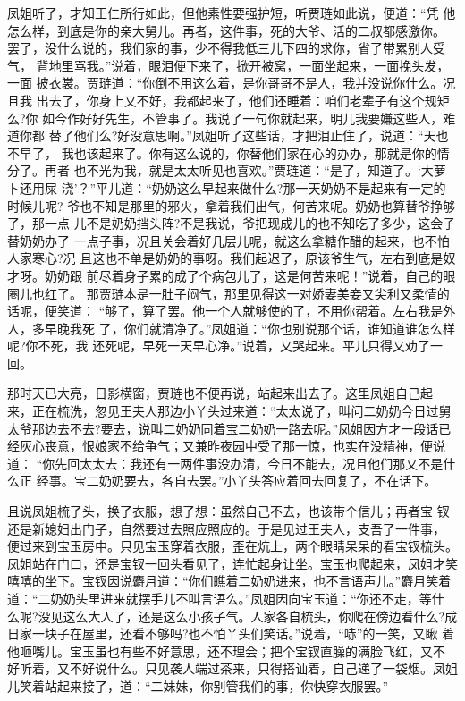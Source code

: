 凤姐听了，才知王仁所行如此，但他素性要强护短，听贾琏如此说，便道：“凭
他怎么样，到底是你的亲大舅儿。再者，这件事，死的大爷、活的二叔都感激你。
罢了，没什么说的，我们家的事，少不得我低三儿下四的求你，省了带累别人受气，
背地里骂我。”说着，眼泪便下来了，掀开被窝，一面坐起来，一面挽头发，一面
披衣裳。贾琏道：“你倒不用这么着，是你哥哥不是人，我并没说你什么。况且我
出去了，你身上又不好，我都起来了，他们还睡着：咱们老辈子有这个规矩么?你
如今作好好先生，不管事了。我说了一句你就起来，明儿我要嫌这些人，难道你都
替了他们么?好没意思啊。”凤姐听了这些话，才把泪止住了，说道：“天也不早了，
我也该起来了。你有这么说的，你替他们家在心的办办，那就是你的情分了。再者
也不光为我，就是太太听见也喜欢。”贾琏道：“是了，知道了。‘大萝卜还用屎
浇’？”平儿道：“奶奶这么早起来做什么?那一天奶奶不是起来有一定的时候儿呢?
爷也不知是那里的邪火，拿着我们出气，何苦来呢。奶奶也算替爷挣够了，那一点
儿不是奶奶挡头阵?不是我说，爷把现成儿的也不知吃了多少，这会子替奶奶办了
一点子事，况且关会着好几层儿呢，就这么拿糖作醋的起来，也不怕人家寒心?况
且这也不单是奶奶的事呀。我们起迟了，原该爷生气，左右到底是奴才呀。奶奶跟
前尽着身子累的成了个病包儿了，这是何苦来呢！”说着，自己的眼圈儿也红了。
那贾琏本是一肚子闷气，那里见得这一对娇妻美妾又尖利又柔情的话呢，便笑道：
“够了，算了罢。他一个人就够使的了，不用你帮着。左右我是外人，多早晚我死
了，你们就清净了。”凤姐道：“你也别说那个话，谁知道谁怎么样呢?你不死，我
还死呢，早死一天早心净。”说着，又哭起来。平儿只得又劝了一回。

那时天已大亮，日影横窗，贾琏也不便再说，站起来出去了。这里凤姐自己起
来，正在梳洗，忽见王夫人那边小丫头过来道：“太太说了，叫问二奶奶今日过舅
太爷那边去不去?要去，说叫二奶奶同着宝二奶奶一路去呢。”凤姐因方才一段话已
经灰心丧意，恨娘家不给争气；又兼昨夜园中受了那一惊，也实在没精神，便说道：
“你先回太太去：我还有一两件事没办清，今日不能去，况且他们那又不是什么正
经事。宝二奶奶要去，各自去罢。”小丫头答应着回去回复了，不在话下。

且说凤姐梳了头，换了衣服，想了想：虽然自己不去，也该带个信儿；再者宝
钗还是新媳妇出门子，自然要过去照应照应的。于是见过王夫人，支吾了一件事，
便过来到宝玉房中。只见宝玉穿着衣服，歪在炕上，两个眼睛呆呆的看宝钗梳头。
凤姐站在门口，还是宝钗一回头看见了，连忙起身让坐。宝玉也爬起来，凤姐才笑
嘻嘻的坐下。宝钗因说麝月道：“你们瞧着二奶奶进来，也不言语声儿。”麝月笑着
道：“二奶奶头里进来就摆手儿不叫言语么。”凤姐因向宝玉道：“你还不走，等什
么呢?没见这么大人了，还是这么小孩子气。人家各自梳头，你爬在傍边看什么?成
日家一块子在屋里，还看不够吗?也不怕丫头们笑话。”说着，“哧”的一笑，又瞅
着他咂嘴儿。宝玉虽也有些不好意思，还不理会；把个宝钗直臊的满脸飞红，又不
好听着，又不好说什么。只见袭人端过茶来，只得搭讪着，自己递了一袋烟。凤姐
儿笑着站起来接了，道：“二妹妹，你别管我们的事，你快穿衣服罢。”

